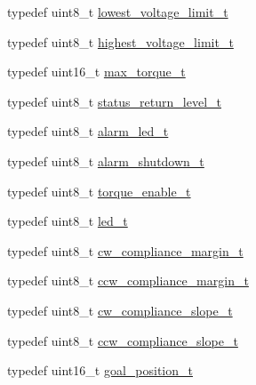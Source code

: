 \begin{DoxyCompactItemize}
\item 
typedef uint8\+\_\+t \hyperlink{structdynamixel_1_1servos_1_1_model_traits_3_01_ax18_01_4_1_1_c_t_a19951f82e4d9be6bc57ed97f1fa561ea}{lowest\+\_\+voltage\+\_\+limit\+\_\+t}
\item 
typedef uint8\+\_\+t \hyperlink{structdynamixel_1_1servos_1_1_model_traits_3_01_ax18_01_4_1_1_c_t_a01175a26f3d367d3e7cf231541ca890f}{highest\+\_\+voltage\+\_\+limit\+\_\+t}
\item 
typedef uint16\+\_\+t \hyperlink{structdynamixel_1_1servos_1_1_model_traits_3_01_ax18_01_4_1_1_c_t_a0b8560b51a1ddbd79ff0c26f1d32ef78}{max\+\_\+torque\+\_\+t}
\item 
typedef uint8\+\_\+t \hyperlink{structdynamixel_1_1servos_1_1_model_traits_3_01_ax18_01_4_1_1_c_t_a89b41ffa65f905beb50d6977bb35c020}{status\+\_\+return\+\_\+level\+\_\+t}
\item 
typedef uint8\+\_\+t \hyperlink{structdynamixel_1_1servos_1_1_model_traits_3_01_ax18_01_4_1_1_c_t_aaa7a190c2bc1ace4b6bd9d72aeedb2c1}{alarm\+\_\+led\+\_\+t}
\item 
typedef uint8\+\_\+t \hyperlink{structdynamixel_1_1servos_1_1_model_traits_3_01_ax18_01_4_1_1_c_t_aaf0cb7a09dc0d74da21dacc00d977f72}{alarm\+\_\+shutdown\+\_\+t}
\item 
typedef uint8\+\_\+t \hyperlink{structdynamixel_1_1servos_1_1_model_traits_3_01_ax18_01_4_1_1_c_t_ad7f7f4681a64903f10a75031ccc1ae29}{torque\+\_\+enable\+\_\+t}
\item 
typedef uint8\+\_\+t \hyperlink{structdynamixel_1_1servos_1_1_model_traits_3_01_ax18_01_4_1_1_c_t_a09ff270603f6411a984d32534ee0e8a6}{led\+\_\+t}
\item 
typedef uint8\+\_\+t \hyperlink{structdynamixel_1_1servos_1_1_model_traits_3_01_ax18_01_4_1_1_c_t_a3336eec7cb29408d31318b9fbff7efd4}{cw\+\_\+compliance\+\_\+margin\+\_\+t}
\item 
typedef uint8\+\_\+t \hyperlink{structdynamixel_1_1servos_1_1_model_traits_3_01_ax18_01_4_1_1_c_t_a6dcc1b0ea41bf71989fb98e42db17912}{ccw\+\_\+compliance\+\_\+margin\+\_\+t}
\item 
typedef uint8\+\_\+t \hyperlink{structdynamixel_1_1servos_1_1_model_traits_3_01_ax18_01_4_1_1_c_t_a88424c4e8c9a8f5a1926aec52fd95483}{cw\+\_\+compliance\+\_\+slope\+\_\+t}
\item 
typedef uint8\+\_\+t \hyperlink{structdynamixel_1_1servos_1_1_model_traits_3_01_ax18_01_4_1_1_c_t_a9d4235f32b00ffb6d4db1c60e68b2b37}{ccw\+\_\+compliance\+\_\+slope\+\_\+t}
\item 
typedef uint16\+\_\+t \hyperlink{structdynamixel_1_1servos_1_1_model_traits_3_01_ax18_01_4_1_1_c_t_a895aaad3a8aeec3cdeb4346031da1560}{goal\+\_\+position\+\_\+t}

\end{DoxyCompactItemize}
